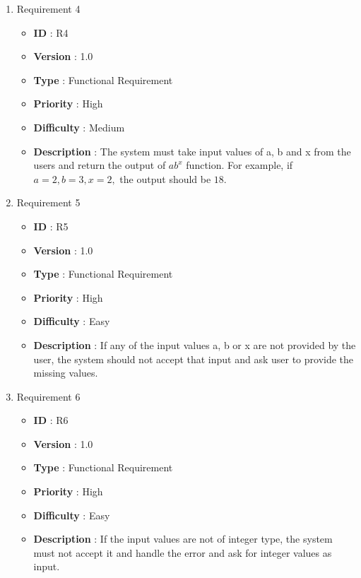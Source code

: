 \documentclass[12pt, a4paper]{article}
\begin{document}
\begin{enumerate}
    \newpage
    
    \item{} Requirement 4
        \begin{itemize}
        \item \textbf{ID} : R4
        \item \textbf{Version} : 1.0
        \item \textbf{Type} : Functional Requirement
        \item \textbf{Priority} : High
        \item \textbf{Difficulty} : Medium
        \item \textbf{Description} : The system must take input values of a, b and x from the users and return the output of $ab^x$ function. For example, if $ a = 2, b = 3 , x = 2,$ the output should be $ 18 $.
        \end{itemize}
    
    \item{} Requirement 5
        \begin{itemize}
        \item \textbf{ID} : R5
        \item \textbf{Version} : 1.0
        \item \textbf{Type} : Functional Requirement
        \item \textbf{Priority} : High
        \item \textbf{Difficulty} : Easy
        \item \textbf{Description} : If any of the input values a, b or x are not provided by the user, the system should not accept that input and ask user to provide the missing values. 
        \end{itemize}
    
    \item{} Requirement 6
        \begin{itemize}
        \item \textbf{ID} : R6
        \item \textbf{Version} : 1.0
        \item \textbf{Type} : Functional Requirement
        \item \textbf{Priority} : High
        \item \textbf{Difficulty} : Easy
        \item \textbf{Description} : If the input values are not of integer type, the system must not accept it and handle the error and ask for integer values as input.
        \end{itemize}
        

\end{enumerate}
\end{document}
